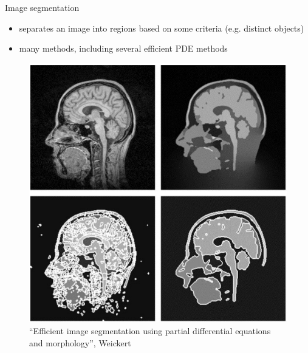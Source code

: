 \documentclass{beamer}
\begin{document}
\begin{frame}{Image segmentation}
    
    \begin{itemize}
        \item separates an image into regions based on some criteria (e.g. distinct objects)
        \item many methods, including several efficient PDE methods
    \end{itemize}
    
    \begin{figure}[h!]
        \centering            \includegraphics[scale=0.22]{segmentation2.png}
        \caption{``Efficient image segmentation using partial differential equations and morphology'', Weickert}
    \end{figure}

\end{frame}
\end{document}
